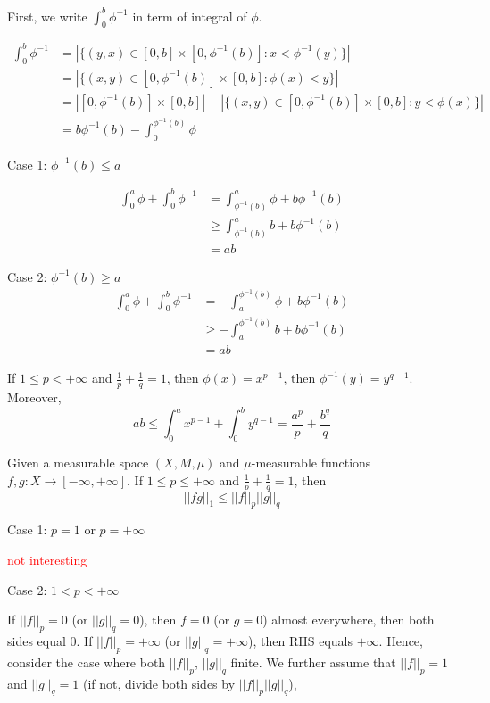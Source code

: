 \documentclass{report}
\begin{document}
First, we write $\int_0^b \phi^{-1}$ in term of integral of $\phi$.

\begin{align*}
    \int_0^b \phi^{-1}
    &= |\{ (y, x) \in [0, b] \times [0, \phi^{-1}(b)]: x < \phi^{-1}(y) \}| \\
    &= |\{ (x, y) \in [0, \phi^{-1}(b)] \times [0, b]: \phi(x) < y \}| \\
    &= |[0, \phi^{-1}(b)] \times [0, b]| - |\{ (x, y) \in [0, \phi^{-1}(b)] \times [0, b]: y < \phi(x) \}| \\
    &= b \phi^{-1}(b) - \int_0^{\phi^{-1}(b)} \phi
\end{align*}

Case 1: $\phi^{-1}(b) \leq a$

\begin{align*}
    \int_0^a \phi + \int_0^b \phi^{-1}
    &= \int_{\phi^{-1}(b)}^a \phi + b \phi^{-1}(b) \\
    &\geq \int_{\phi^{-1}(b)}^a b + b \phi^{-1}(b) \\
    &= ab
\end{align*}

Case 2: $\phi^{-1}(b) \geq a$
\begin{align*}
    \int_0^a \phi + \int_0^b \phi^{-1}
    &= - \int_a^{\phi^{-1}(b)} \phi + b \phi^{-1}(b) \\
    &\geq - \int_a^{\phi^{-1}(b)} b + b \phi^{-1}(b) \\
    &= ab
\end{align*}


If $1 \leq p < +\infty$ and $\frac{1}{p} + \frac{1}{q} = 1$, then 
$\phi(x) = x^{p-1}$, then $\phi^{-1}(y) = y^{q-1}$. Moreover,
\[
    ab \leq \int_0^a x^{p-1} + \int_0^b y^{q-1} = \frac{a^p}{p} + \frac{b^q}{q}
\]


\begin{theorem}
     Given a measurable space $(X, M, \mu)$ and $\mu$-measurable functions $f, g: X \to [-\infty, +\infty]$. If $1 \leq p \leq +\infty$ and $\frac{1}{p} + \frac{1}{q} = 1$, then
    \[
        ||fg||_1 \leq ||f||_p ||g||_q
    \]
\end{theorem}

Case 1: $p = 1$ or $p = +\infty$

\textcolor{red}{not interesting}

Case 2: $1 < p < +\infty$

If $||f||_p = 0$ (or $||g||_q = 0$), then $f = 0$ (or $g = 0$) almost everywhere, then both sides equal $0$. If $||f||_p = +\infty$ (or $||g||_q = +\infty$), then RHS equals $+\infty$. Hence, consider the case where both $||f||_p$, $||g||_q$ finite. We further assume that $||f||_p = 1$ and $||g||_q = 1$ (if not, divide both sides by $||f||_p ||g||_q$),
\end{document}
